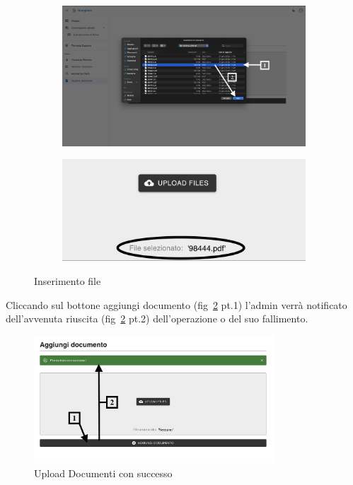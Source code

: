 \begin{figure}[h!]
    \centering
    \begin{subfigure}{0.4\textwidth}
        \centering
        \includegraphics[width=\textwidth]{./img/PaginaGestioneDocumenti3.png}
    \end{subfigure}
    \hspace{0.05\textwidth}
    \begin{subfigure}{0.4\textwidth}
        \centering
        \includegraphics[width=\textwidth]{./img/GestioneDocumenti4.png}
    \end{subfigure}
    \caption{Inserimento file}
    \label{fig:gestione3}
\end{figure}
Cliccando sul bottone aggiungi documento (fig~\ref{fig:gestione4} pt.1) l'admin verrà notificato dell'avvenuta riuscita (fig~\ref{fig:gestione4} pt.2) dell'operazione o del suo fallimento.
\begin{figure}[h!]
    \centering
    \includegraphics[width=0.8\textwidth]{./img/GestioneDocumenti5.png}
    \caption{Upload Documenti con successo}
    \label{fig:gestione4}
\end{figure}

